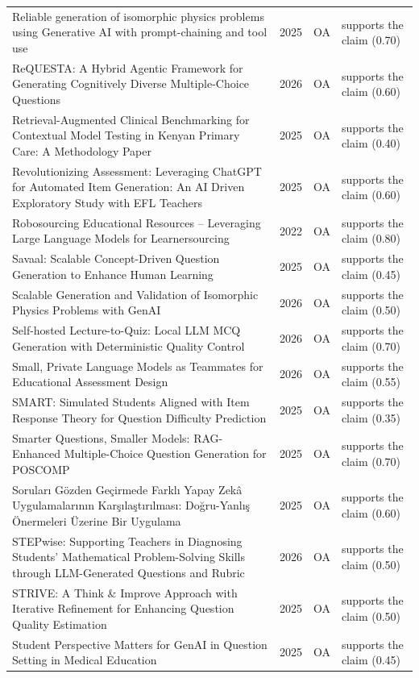 \begin{longtable}{@{}%
  >{\raggedright\arraybackslash}p{}c%
  >{\raggedright\arraybackslash}p{}%
  >{\raggedright\arraybackslash}p{}@{}}
Reliable generation of isomorphic physics problems using Generative AI with prompt-chaining and tool use & 2025 & OA & supports the claim (0.70) \\
ReQUESTA: A Hybrid Agentic Framework for Generating Cognitively Diverse Multiple-Choice Questions & 2026 & OA & supports the claim (0.60) \\
Retrieval-Augmented Clinical Benchmarking for Contextual Model Testing in Kenyan Primary Care: A Methodology Paper & 2025 & OA & supports the claim (0.40) \\
Revolutionizing Assessment: Leveraging ChatGPT for Automated Item Generation: An AI Driven Exploratory Study with EFL Teachers & 2025 & OA & supports the claim (0.60) \\
Robosourcing Educational Resources -- Leveraging Large Language Models for Learnersourcing & 2022 & OA & supports the claim (0.80) \\
Savaal: Scalable Concept-Driven Question Generation to Enhance Human Learning & 2025 & OA & supports the claim (0.45) \\
Scalable Generation and Validation of Isomorphic Physics Problems with GenAI & 2026 & OA & supports the claim (0.50) \\
Self-hosted Lecture-to-Quiz: Local LLM MCQ Generation with Deterministic Quality Control & 2026 & OA & supports the claim (0.70) \\
Small, Private Language Models as Teammates for Educational Assessment Design & 2026 & OA & supports the claim (0.55) \\
SMART: Simulated Students Aligned with Item Response Theory for Question Difficulty Prediction & 2025 & OA & supports the claim (0.35) \\
Smarter Questions, Smaller Models: RAG-Enhanced Multiple-Choice Question Generation for POSCOMP & 2025 & OA & supports the claim (0.70) \\
Soruları Gözden Geçirmede Farklı Yapay Zekâ Uygulamalarının Karşılaştırılması: Doğru-Yanlış Önermeleri Üzerine Bir Uygulama & 2025 & OA & supports the claim (0.60) \\
STEPwise: Supporting Teachers in Diagnosing Students' Mathematical Problem-Solving Skills through LLM-Generated Questions and Rubric & 2026 & OA & supports the claim (0.50) \\
STRIVE: A Think \& Improve Approach with Iterative Refinement for Enhancing Question Quality Estimation & 2025 & OA & supports the claim (0.50) \\
Student Perspective Matters for GenAI in Question Setting in Medical Education & 2025 & OA & supports the claim (0.45) \\

\end{longtable}
